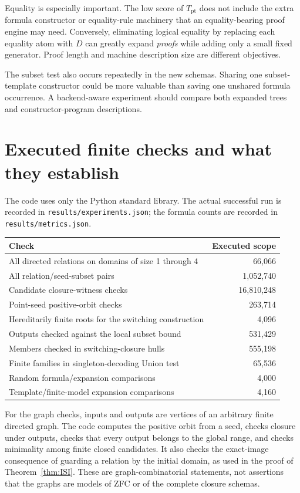\documentclass[11pt,letterpaper]{article}
\theoremstyle{definition}\newtheorem{definition}[theorem]{Definition}
\theoremstyle{remark}\newtheorem{remark}[theorem]{Remark}
\newcommand{\Tpt}{T_{\mathrm{pt}}}
\begin{document}
Equality is especially important. The low score of $\Tpt$ does not
include the extra formula constructor or equality-rule machinery that
an equality-bearing proof engine may need. Conversely, eliminating
logical equality by replacing each equality atom with $D$ can greatly
expand \emph{proofs} while adding only a small fixed generator. Proof
length and machine description size are different objectives.

The subset test also occurs repeatedly in the new schemas. Sharing one
subset-template constructor could be more valuable than saving one
unshared formula occurrence. A backend-aware experiment should compare
both expanded trees and constructor-program descriptions.

\section{Executed finite checks and what they establish}
\label{sec:experiments}

The code uses only the Python standard library. The actual successful
run is recorded in \texttt{results/experiments.json}; the formula counts
are recorded in \texttt{results/metrics.json}.

\begin{center}
\begin{tabular}{p{.66\linewidth}r}
\toprule
Check & Executed scope\\
\midrule
All directed relations on domains of size 1 through 4 & 66,066\\
All relation/seed-subset pairs & 1,052,740\\
Candidate closure-witness checks & 16,810,248\\
Point-seed positive-orbit checks & 263,714\\
Hereditarily finite roots for the switching construction & 4,096\\
Outputs checked against the local subset bound & 531,429\\
Members checked in switching-closure hulls & 555,198\\
Finite families in singleton-decoding Union test & 65,536\\
Random formula/expansion comparisons & 4,000\\
Template/finite-model expansion comparisons & 4,160\\
\bottomrule
\end{tabular}
\end{center}

For the graph checks, inputs and outputs are vertices of an arbitrary
finite directed graph. The code computes the positive orbit from a seed,
checks closure under outputs, checks that every output belongs to the
global range, and checks minimality among finite closed candidates.
It also checks the exact-image consequence of guarding a relation by
the initial domain, as used in the proof of Theorem~\ref{thm:ISI}.
These are graph-combinatorial statements, not assertions that the graphs
are models of ZFC or of the complete closure schemas.
\end{document}

